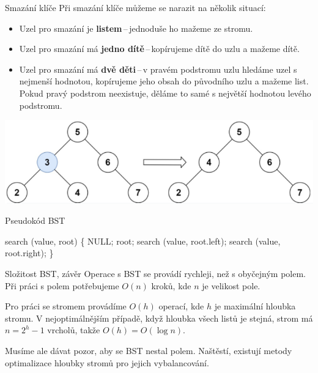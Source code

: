 \documentclass[10pt]{beamer}
\begin{document}
\begin{frame}[t]{Smazání klíče}
    Při smazání klíče můžeme se narazit na několik situací:
    \begin{itemize}
        \item Uzel pro smazání je \textbf{listem}\,--\,jednoduše ho mažeme ze stromu.
        \item Uzel pro smazání má \textbf{jedno dítě}\,--\,kopírujeme dítě do uzlu a mažeme dítě.
        \item Uzel pro smazání má \textbf{dvě děti}\,--\,v pravém podstromu uzlu hledáme uzel s nejmenší hodnotou, kopírujeme jeho obsah do původního uzlu a mažeme list. Pokud pravý podstrom neexistuje, děláme to samé s největší hodnotou levého podstromu.
    \end{itemize}
    \medskip
    \begin{center}
        \includegraphics[scale=0.53]{mazani.png}
    \end{center}
\end{frame}

\begin{frame}[fragile]{Pseudokód BST}
    \begin{algorithm}[H]
    \begin{algorithmic}[1]
    \STATE search (value, root) \{
            \RETURN NULL;
            \RETURN root;
            \RETURN search (value, root.left);
        \ELSE
            \RETURN search (value, root.right);
        \ENDIF
    \STATE \}
    \end{algorithmic}
    \caption{Pseudokód pro vyhledávání klíče v BST}
    \label{alg:seq}
    \end{algorithm}
\end{frame}

\begin{frame}{Složitost BST, závěr}
    Operace s BST se provádí rychleji, než s obyčejným polem. Při práci s polem potřebujeme $O(n)$ kroků, kde $n$ je velikost pole.
    
    Pro práci se stromem provádíme $O(h)$ operací, kde $h$ je maximální hloubka stromu. V nejoptimálnějším případě, když hloubka všech listů je stejná, strom má $n=2^{h}-1$ vrcholů, takže $O(h)=O(\log n)$. 
    
    Musíme ale dávat pozor, aby se BST nestal polem. Naštěstí, existují metody optimalizace hloubky stromů pro jejich vybalancování.  
\end{frame}
\end{document}
